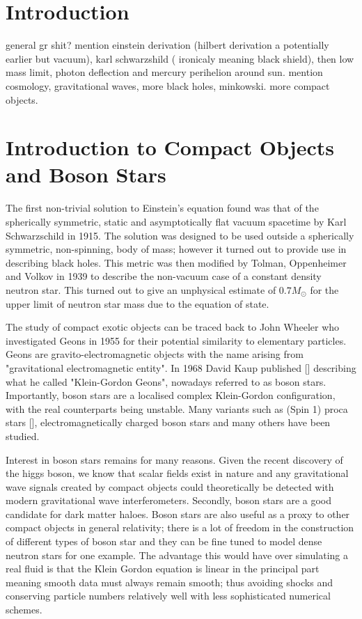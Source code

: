 

\section{Introduction}
general gr shit?
mention einstein derivation (hilbert derivation a potentially earlier but vacuum), karl schwarzshild ( ironicaly meaning black shield), then low mass limit, photon deflection and mercury perihelion around sun. mention cosmology, gravitational waves, more black holes, minkowski. more compact objects. 

\section{Introduction to Compact Objects and Boson Stars}
The first non-trivial solution to Einstein's equation found was that of the spherically symmetric, static and asymptotically flat vacuum spacetime by Karl Schwarzschild in 1915. The solution was designed to be used outside a spherically symmetric, non-spinning, body of mass; however it turned out to provide use in describing black holes. This metric was then modified by Tolman, Oppenheimer and Volkov in 1939 to describe the non-vacuum case of a constant density neutron star. This turned out to give an unphysical estimate of $0.7 M_\odot$ for the upper limit of neutron star mass due to the equation of state. 

The study of compact exotic objects can be traced back to John Wheeler who investigated Geons in 1955 for their potential similarity to elementary particles. Geons are gravito-electromagnetic objects with the name arising from "gravitational electromagnetic entity". In 1968 David Kaup published [] describing what he called "Klein-Gordon Geons", nowadays referred to as boson stars. Importantly, boson stars are a localised complex Klein-Gordon configuration, with the real counterparts being unstable. Many variants such as (Spin 1) proca stars [], electromagnetically charged boson stars and many others have been studied. 

Interest in boson stars remains for many reasons. Given the recent discovery of the higgs boson, we know that scalar fields exist in nature and any gravitational wave signals created by compact objects could theoretically be detected with modern gravitational wave interferometers. Secondly, boson stars are a good candidate for dark matter haloes. Boson stars are also useful as a proxy to other compact objects in general relativity; there is a lot of freedom in the construction of different types of boson star and they can be fine tuned to model dense neutron stars for one example. The advantage this would have over simulating a real fluid is that the Klein Gordon equation is linear in the principal part meaning smooth data must always remain smooth; thus avoiding shocks and conserving particle numbers relatively well with less sophisticated numerical schemes. 

